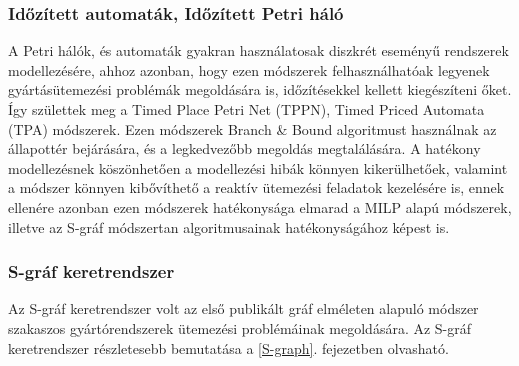 \subsubsection{Időzített automaták, Időzített Petri háló}
A Petri hálók, és automaták gyakran használatosak diszkrét eseményű rendszerek modellezésére, ahhoz azonban, hogy ezen módszerek felhasználhatóak legyenek gyártásütemezési problémák megoldására is, időzítésekkel kellett kiegészíteni őket.
Így születtek meg a Timed Place Petri Net (TPPN), Timed Priced Automata (TPA) módszerek.
Ezen módszerek Branch \& Bound algoritmust használnak az állapottér bejárására, és a legkedvezőbb megoldás megtalálására.
A hatékony modellezésnek köszönhetően a modellezési hibák könnyen kikerülhetőek, valamint a módszer könnyen kibővíthető a reaktív ütemezési feladatok kezelésére is, ennek ellenére azonban ezen módszerek hatékonysága elmarad a MILP alapú módszerek, illetve az S-gráf módszertan algoritmusainak hatékonyságához képest is.  
\subsubsection{S-gráf keretrendszer}
Az S-gráf keretrendszer volt az első publikált gráf elméleten alapuló módszer szakaszos gyártórendszerek ütemezési problémáinak megoldására. \cite{Sanmarti2002}
Az S-gráf keretrendszer részletesebb bemutatása a \ref{S-graph}. fejezetben olvasható. 
